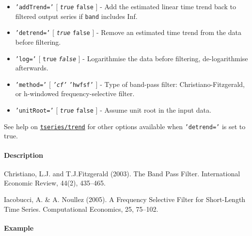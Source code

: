 \begin{itemize}
\item
  \texttt{'addTrend='} {[} \emph{\texttt{true}} \textbar{}
  \texttt{false} {]} - Add the estimated linear time trend back to
  filtered output series if \texttt{band} includes Inf.
\item
  \texttt{'detrend='} {[} \emph{\texttt{true}} \textbar{} \texttt{false}
  {]} - Remove an estimated time trend from the data before filtering.
\item
  \texttt{'log='} {[} \texttt{true} \textbar{} \emph{\texttt{false}} {]}
  - Logarithmise the data before filtering, de-logarithmise afterwards.
\item
  \texttt{'method='} {[} \emph{\texttt{'cf'}} \textbar{}
  \texttt{'hwfsf'} {]} - Type of band-pass filter:
  Christiano-Fitzgerald, or h-windowed frequency-selective filter.
\item
  \texttt{'unitRoot='} {[} \emph{\texttt{true}} \textbar{}
  \texttt{false} {]} - Assume unit root in the input data.
\end{itemize}

See help on \href{tseries/trend}{\texttt{tseries/trend}} for other
options available when \texttt{'detrend='} is set to true.

\paragraph{Description}\label{description}

Christiano, L.J. and T.J.Fitzgerald (2003). The Band Pass Filter.
International Economic Review, 44(2), 435--465.

Iacobucci, A. \& A. Noullez (2005). A Frequency Selective Filter for
Short-Length Time Series. Computational Economics, 25, 75--102.

\paragraph{Example}\label{example}


